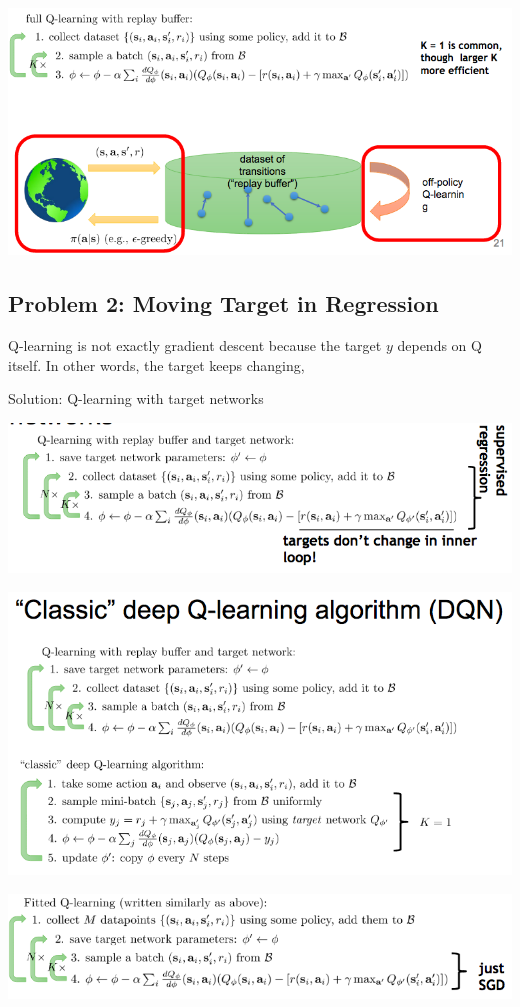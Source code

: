 \documentclass{article}
\begin{document}
\includegraphics[scale=0.5]{replayBuffer.png}

\subsection{Problem 2: Moving Target in Regression}
Q-learning is not exactly gradient descent because the target $y$ depends on Q itself. In other words, the target keeps changing,

Solution: Q-learning with target networks

\includegraphics[scale=0.5]{targetNet.png}

\includegraphics[scale=0.5]{DQN.png}

\includegraphics[scale=0.5]{FQL.png}
\end{document}
